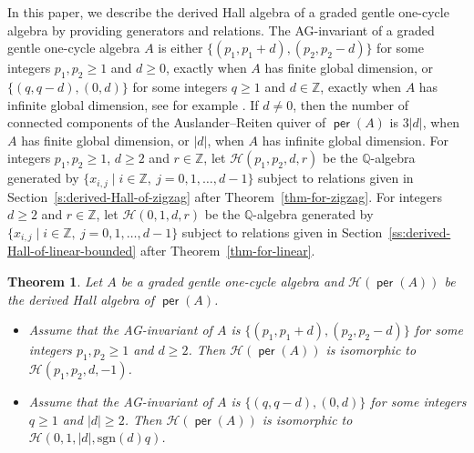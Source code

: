 \documentclass[reqno,12pt,a4paper]{amsart}
\newtheorem{theorem}{Theorem}[section]
\theoremstyle{remark}
\theoremstyle{definition}
\newcommand{\opname}[1]{\operatorname{\mathsf{#1}}}
\newcommand{\per}{\opname{per}\nolimits}
\newcommand{\ch}{{\mathcal H}}
\numberwithin{equation}{section}
\begin{document}
In this paper, we describe the derived Hall algebra of a graded gentle one-cycle algebra by providing generators and relations. The AG-invariant of a graded gentle one-cycle algebra $A$ is either $\{(p_1,p_1+d),(p_2,p_2-d)\}$ for some integers $p_1,p_2\geq 1$ and $d\geq 0$, exactly when $A$ has finite global dimension, or $\{(q,q-d),(0,d)\}$ for some integers $q\geq 1$ and $d\in\mathbb{Z}$, exactly when $A$ has infinite global dimension, see for example \cite[Lemma 6.2]{ChenYang25}. If $d\neq 0$, then the number of connected components of the Auslander--Reiten quiver of $\per(A)$ is $3|d|$, when $A$ has finite global dimension, or $|d|$, when $A$ has infinite global dimension. For integers $p_1,p_2\geq 1$, $d\geq 2$ and $r\in\mathbb{Z}$, let $\ch(p_1,p_2,d,r)$ be the $\mathbb{Q}$-algebra generated by $\{x_{i,j}\mid i\in\mathbb{Z},~j=0,1,\ldots,d-1\}$ subject to relations given in Section~\ref{s:derived-Hall-of-zigzag} after Theorem~\ref{thm-for-zigzag}. For integers $d\geq 2$ and $r\in\mathbb{Z}$, let $\ch(0,1,d,r)$ be the $\mathbb{Q}$-algebra generated by $\{x_{i,j}\mid i\in\mathbb{Z},~j=0,1,\ldots,d-1\}$ subject to relations given in Section~\ref{ss:derived-Hall-of-linear-bounded} after Theorem~\ref{thm-for-linear}.

\begin{theorem}
\label{main-theorem}
Let $A$ be a graded gentle one-cycle algebra and $\ch(\per(A))$ be the derived Hall algebra of $\per(A)$.
\begin{itemize}
\item[(a)] Assume that the AG-invariant of $A$ is $\{(p_1,p_1+d),(p_2,p_2-d)\}$ for some integers $p_1,p_2\geq 1$ and $d\geq 2$. Then $\ch(\per(A))$ is isomorphic to $\ch(p_1,p_2,d,-1)$.
\item[(b)] Assume that the AG-invariant of $A$ is $\{(q,q-d),(0,d)\}$ for some integers $q\geq 1$ and $|d|\geq 2$. Then $\ch(\per(A))$ is isomorphic to $\ch(0,1,|d|,\mathrm{sgn}(d)q)$.
\end{itemize}
\end{theorem}
\end{document}
